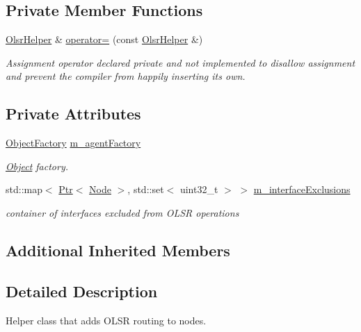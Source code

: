 \subsection*{Private Member Functions}
\begin{DoxyCompactItemize}
\item 
\hyperlink{classns3_1_1OlsrHelper}{Olsr\+Helper} \& \hyperlink{classns3_1_1OlsrHelper_a013f29a5ef68e89bc0c77a8a35551dbe}{operator=} (const \hyperlink{classns3_1_1OlsrHelper}{Olsr\+Helper} \&)
\begin{DoxyCompactList}\small\item\em Assignment operator declared private and not implemented to disallow assignment and prevent the compiler from happily inserting its own. \end{DoxyCompactList}\end{DoxyCompactItemize}
\subsection*{Private Attributes}
\begin{DoxyCompactItemize}
\item 
\hyperlink{classns3_1_1ObjectFactory}{Object\+Factory} \hyperlink{classns3_1_1OlsrHelper_ae4cbeaa56d8d2abe3810b8706b5a98f3}{m\+\_\+agent\+Factory}
\begin{DoxyCompactList}\small\item\em \hyperlink{classns3_1_1Object}{Object} factory. \end{DoxyCompactList}\item 
std\+::map$<$ \hyperlink{classns3_1_1Ptr}{Ptr}$<$ \hyperlink{classns3_1_1Node}{Node} $>$, std\+::set$<$ uint32\+\_\+t $>$ $>$ \hyperlink{classns3_1_1OlsrHelper_af926eab0592bd5210491ffd2c769aa7d}{m\+\_\+interface\+Exclusions}
\begin{DoxyCompactList}\small\item\em container of interfaces excluded from O\+L\+SR operations \end{DoxyCompactList}\end{DoxyCompactItemize}
\subsection*{Additional Inherited Members}


\subsection{Detailed Description}
Helper class that adds O\+L\+SR routing to nodes. 

